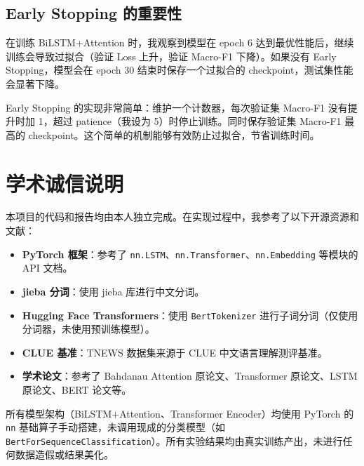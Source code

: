 \documentclass[a4paper]{article}
\begin{document}
\subsection{Early Stopping 的重要性}

在训练 BiLSTM+Attention 时，我观察到模型在 epoch 6 达到最优性能后，继续训练会导致过拟合（验证 Loss 上升，验证 Macro-F1 下降）。如果没有 Early Stopping，模型会在 epoch 30 结束时保存一个过拟合的 checkpoint，测试集性能会显著下降。

Early Stopping 的实现非常简单：维护一个计数器，每次验证集 Macro-F1 没有提升时加 1，超过 patience（我设为 5）时停止训练。同时保存验证集 Macro-F1 最高的 checkpoint。这个简单的机制能够有效防止过拟合，节省训练时间。

\section{学术诚信说明}

本项目的代码和报告均由本人独立完成。在实现过程中，我参考了以下开源资源和文献：

\begin{itemize}
    \item \textbf{PyTorch 框架}\cite{paszke2019pytorch}：参考了 \texttt{nn.LSTM}、\texttt{nn.Transformer}、\texttt{nn.Embedding} 等模块的 API 文档。
    \item \textbf{jieba 分词}\cite{jieba}：使用 jieba 库进行中文分词。
    \item \textbf{Hugging Face Transformers}\cite{wolf2020transformers}：使用 \texttt{BertTokenizer} 进行子词分词（仅使用分词器，未使用预训练模型）。
    \item \textbf{CLUE 基准}\cite{xu2020clue}：TNEWS 数据集来源于 CLUE 中文语言理解测评基准。
    \item \textbf{学术论文}：参考了 Bahdanau Attention 原论文\cite{bahdanau2014neural}、Transformer 原论文\cite{vaswani2017attention}、LSTM 原论文\cite{hochreiter1997lstm}、BERT 论文\cite{devlin2019bert}等。
\end{itemize}

所有模型架构（BiLSTM+Attention、Transformer Encoder）均使用 PyTorch\cite{paszke2019pytorch} 的 \texttt{nn} 基础算子手动搭建，未调用现成的分类模型（如 \texttt{BertForSequenceClassification}）。所有实验结果均由真实训练产出，未进行任何数据造假或结果美化。
\end{document}
